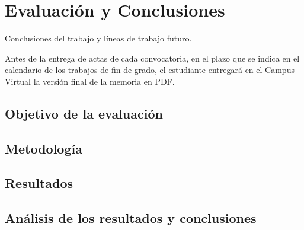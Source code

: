 \chapter{Evaluación y Conclusiones}
\label{cap:conclusiones}

Conclusiones del trabajo y líneas de trabajo futuro.

Antes de la entrega de actas de cada convocatoria, en el plazo que se indica en el calendario de los trabajos de fin de grado, el estudiante entregará en el Campus Virtual la versión final de la memoria en PDF.

\section{Objetivo de la evaluación}

\section{Metodología}

\section{Resultados}

\section{Análisis de los resultados y conclusiones}


